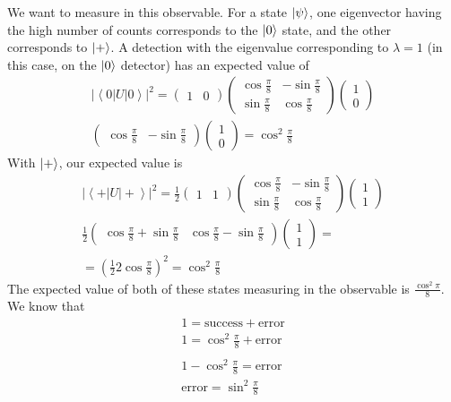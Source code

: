 \documentclass[]{article}
\begin{document}
We want to measure in this observable. For a state \(\ket{\psi}\), one
eigenvector having the high number of counts corresponds to the
\(\ket{0}\) state, and the other corresponds to \(\ket{+}\). A detection
with the eigenvalue corresponding to \(\lambda=1\) (in this case, on the
\(\ket{0}\) detector) has an expected value of \[
\begin{align}
\left| \left<0|U|0\right>  \right| ^{2}= \begin{pmatrix}
1 & 0 
\end{pmatrix}\begin{pmatrix}
\cos \frac{\pi}{8} & -\sin \frac{\pi}{8} \\
\sin \frac{\pi}{8} & \cos \frac{\pi}{8}
\end{pmatrix}\begin{pmatrix}
1 \\
0
\end{pmatrix} \\
\begin{pmatrix}
\cos \frac{\pi}{8}  & -\sin \frac{\pi}{8}
\end{pmatrix}\begin{pmatrix}
1 \\
0
\end{pmatrix}=\cos^{2} \frac{\pi}{8}
\end{align}
\] With \(\ket{+}\), our expected value is \[
\begin{align}
\left| \left<+|U|+\right>  \right| ^{2}= \frac{1}{2} \begin{pmatrix}
1 & 1 
\end{pmatrix}\begin{pmatrix}
\cos \frac{\pi}{8} & -\sin \frac{\pi}{8} \\
\sin \frac{\pi}{8} & \cos \frac{\pi}{8}
\end{pmatrix}\begin{pmatrix}
1 \\
1
\end{pmatrix} \\
\frac{1}{2}\begin{pmatrix}
\cos \frac{\pi}{8}+\sin \frac{\pi}{8}  & \cos \frac{\pi}{8}-\sin \frac{\pi}{8}
\end{pmatrix}\begin{pmatrix}
1 \\
1
\end{pmatrix}= \\
=\left( \frac{1}{2} 2\cos \frac{\pi}{8} \right) ^{2}=\cos^{2} \frac{\pi}{8}
\end{align}
\] The expected value of both of these states measuring in the
observable is \(\frac{\cos^{2}\pi}{8}\). We know that \[
\begin{align}
1 = \text{success}+\text{error} \\
1=\cos^{2} \frac{\pi}{8}+\text{error}\\ \\
1-\cos^{2} \frac{\pi}{8}=\text{error} \\
\text{error} = \sin^{2}{ \frac{\pi}{8} } 
\end{align}
\]
\end{document}
